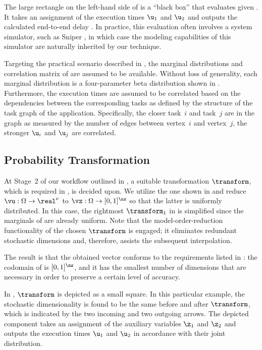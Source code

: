 The large rectangle on the left-hand side of  is a
``black box'' that evaluates \g given \vu. It takes an assignment of the
execution times $\u_1$ and $\u_2$ and outputs the calculated end-to-end delay
\g. In practice, this evaluation often involves a system simulator, such as
Sniper \cite{carlson2011}, in which case the modeling capabilities of this
simulator are naturally inherited by our technique.

Targeting the practical scenario described in , the
marginal distributions and correlation matrix of \vu are assumed to be
available. Without loss of generality, each marginal distribution is a
four-parameter beta distribution shown in . Furthermore,
the execution times are assumed to be correlated based on the dependencies
between the corresponding tasks as defined by the structure of the task graph of
the application. Specifically, the closer task~$i$ and task~$j$ are in the graph
as measured by the number of edges between vertex~$i$ and vertex~$j$, the
stronger $\u_i$ and $\u_j$ are correlated.

\subsection{Probability Transformation}

At Stage~2 of our workflow outlined in , a suitable
transformation $\transform$, which is required in ,
is decided upon. We utilize the one shown in 
and reduce $\vu: \Omega \to \real^\nu$ to $\vz: \Omega \to [0, 1]^\nz$ so that
the latter is uniformly distributed. In this case, the rightmost $\transform_1$
in  is simplified since the marginals of \vz
are already uniform. Note that the model-order-reduction functionality of the
chosen $\transform$ is engaged; it eliminates redundant stochastic dimensions
and, therefore, assists the subsequent interpolation.

The result is that the obtained vector \vz conforms to the requirements listed
in : the codomain of \vz is $[0, 1]^\nz$, and it has
the smallest number of dimensions that are necessary in order to preserve a
certain level of accuracy.

In , $\transform$ is depicted as a small square. In this
particular example, the stochastic dimensionality is found to be the same before
and after $\transform$, which is indicated by the two incoming and two outgoing
arrows. The depicted component takes an assignment of the auxiliary variables
$\z_1$ and $\z_2$ and outputs the execution times $\u_1$ and $\u_2$ in
accordance with their joint distribution.

